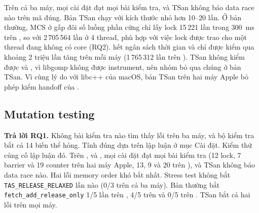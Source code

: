 Trên cả ba máy, mọi cài đặt đạt mọi bài kiểm tra, và TSan không báo data race nào trên mã đúng. Bản TSan
chạy với kích thước nhỏ hơn 10--20 lần. Ở bản thường, MCS ở gấp đôi số luồng phần cứng chỉ lấy lock
15\,221 lần trong 300~ms trên , so với 2\,705\,564 lần ở 4 thread, phù hợp với việc lock
được trao cho một thread đang không có core (RQ2).  hết ngân sách thời gian và chỉ được
kiểm qua khoảng 2 triệu lần tăng trên mỗi máy (1\,765\,312 lần trên ). TSan không kiểm
được  và , vì libgomp không được instrument, nên nhóm bỏ qua chúng ở
bản TSan. Vì cùng lý do với libc++ của macOS, bản TSan trên hai máy Apple bỏ phép kiểm handoff của
.

\subsection{Mutation testing}\label{sec:corr:mutation}
\begin{rqanswer}\textbf{Trả lời RQ1.} Không bài kiểm tra nào tìm thấy lỗi trên ba máy, và bộ kiểm tra bắt
cả 14 biến thể hỏng. Tính đúng dựa trên lập luận ở mục Cài đặt. Kiểm thử củng cố lập luận đó. Trên
,  và , mọi cài đặt đạt mọi bài kiểm tra (12 lock,
7 barrier và 19 counter trên hai máy Apple, 13, 9 và 20 trên ), và TSan không báo data
race nào. Hai lỗi memory order khó bắt nhất. Stress test không bắt \texttt{TAS\_RELEASE\_RELAXED} lần nào
(0/3 trên cả ba máy). Bản thường bắt \texttt{fetch\_add\_release\_only} 1/5 lần trên ,
4/5 trên  và 0/5 trên . TSan bắt cả hai lỗi trên mọi máy.\end{rqanswer}

